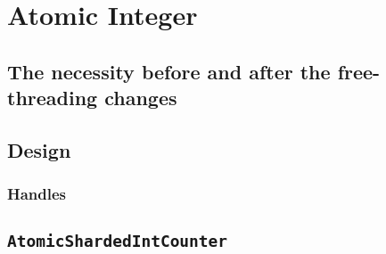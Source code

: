 \chapter{Atomic Integer}

\section{The necessity before and after the free-threading changes}

\section{Design}
\subsection{Handles}\label{subsec:atomic-int-handles}


\section{\texttt{AtomicShardedIntCounter}}\label{sec:atomicshardedintcounter}
